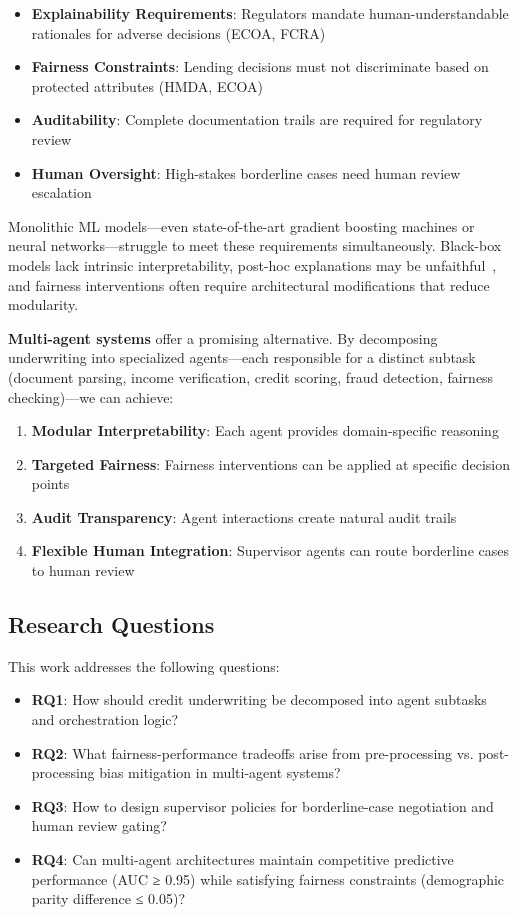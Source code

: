 \documentclass[11pt]{article}
\begin{document}
\begin{itemize}
    \item \textbf{Explainability Requirements}: Regulators mandate human-understandable rationales for adverse decisions (ECOA, FCRA)
    \item \textbf{Fairness Constraints}: Lending decisions must not discriminate based on protected attributes (HMDA, ECOA)
    \item \textbf{Auditability}: Complete documentation trails are required for regulatory review
    \item \textbf{Human Oversight}: High-stakes borderline cases need human review escalation
\end{itemize}

Monolithic ML models---even state-of-the-art gradient boosting machines or neural networks---struggle to meet these requirements simultaneously. Black-box models lack intrinsic interpretability, post-hoc explanations may be unfaithful~\cite{rudin2019stop}, and fairness interventions often require architectural modifications that reduce modularity.

\textbf{Multi-agent systems} offer a promising alternative. By decomposing underwriting into specialized agents---each responsible for a distinct subtask (document parsing, income verification, credit scoring, fraud detection, fairness checking)---we can achieve:

\begin{enumerate}
    \item \textbf{Modular Interpretability}: Each agent provides domain-specific reasoning
    \item \textbf{Targeted Fairness}: Fairness interventions can be applied at specific decision points
    \item \textbf{Audit Transparency}: Agent interactions create natural audit trails
    \item \textbf{Flexible Human Integration}: Supervisor agents can route borderline cases to human review
\end{enumerate}

\subsection{Research Questions}

This work addresses the following questions:

\begin{itemize}
    \item \textbf{RQ1}: How should credit underwriting be decomposed into agent subtasks and orchestration logic?
    \item \textbf{RQ2}: What fairness-performance tradeoffs arise from pre-processing vs. post-processing bias mitigation in multi-agent systems?
    \item \textbf{RQ3}: How to design supervisor policies for borderline-case negotiation and human review gating?
    \item \textbf{RQ4}: Can multi-agent architectures maintain competitive predictive performance (AUC ≥ 0.95) while satisfying fairness constraints (demographic parity difference ≤ 0.05)?
\end{itemize}
\end{document}
